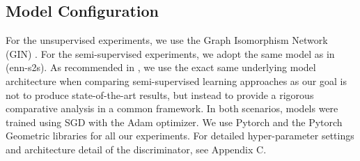 \documentclass{article} \usepackage{iclr2020_conference,times}
\begin{document}
\subsection{Model Configuration}
For the unsupervised experiments, we use the Graph Isomorphism Network (GIN) \cite{xu2018powerful}. For the semi-supervised experiments, we adopt the same model as in \cite{gilmer2017neural} (enn-s2s). As recommended in \cite{oliver2018realistic}, we use the exact same underlying model architecture when comparing semi-supervised learning approaches as our goal is not to produce state-of-the-art results, but instead to provide a rigorous comparative analysis in a common framework. In both scenarios, models were trained using SGD with the Adam optimizer. We use Pytorch \cite{paszke2017automatic} and the Pytorch Geometric \cite{fey2019fast} libraries for all our experiments. For detailed hyper-parameter settings and architecture detail of the discriminator, see Appendix C.
\end{document}
